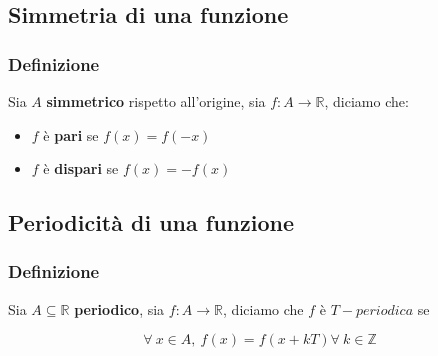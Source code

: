 \subsection{Simmetria di una funzione}
    \subsubsection*{Definizione}
        Sia $A$ \textbf{simmetrico} rispetto all'origine, sia $f:A \rightarrow \mathbb{R}$, diciamo che:
        \begin{itemize}
            \item $f$ è \textbf{pari} se $f(x) = f(-x)$
            \item $f$ è \textbf{dispari} se $f(x) = -f(x)$
        \end{itemize}
    \subsection{Periodicità di una funzione}
\subsubsection*{Definizione}
    Sia $A \subseteq \mathbb{R}$ \textbf{periodico}, sia $f: A \rightarrow \mathbb{R}$, diciamo che $f$ è $T-periodica$ se
    \begin{Large}
        \[
            \forall\ x \in A,\ f(x) = f(x+kT) \forall\ k \in \mathbb{Z}    
        \]
    \end{Large}